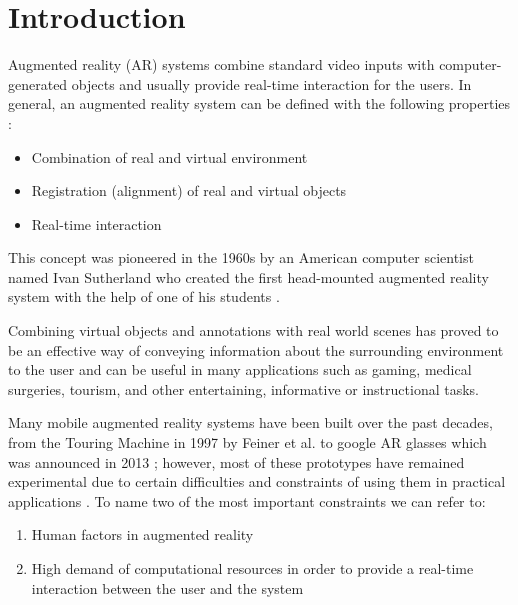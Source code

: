 \chapter{Introduction}
\label{chap:Introduction}

Augmented reality (AR) systems combine standard video inputs with computer-generated objects and
usually provide real-time interaction for the users. 
In general, an augmented reality system can be defined with the following properties \cite{azuma01} :
\begin{itemize}
\item Combination of real and virtual environment
\item Registration (alignment) of real and virtual objects
\item Real-time interaction
\end{itemize}
This concept was pioneered in the 1960s by an American computer scientist named Ivan Sutherland
who created the first head-mounted augmented reality
system with the help of one of his students \cite{azuma01}.

Combining virtual objects and annotations with real
world scenes has proved to be an effective way of conveying information about the surrounding environment to
the user and can be useful in many applications such as gaming, medical surgeries, tourism, and other entertaining, informative or instructional tasks.

Many mobile augmented reality systems have been built over the past decades, from the Touring Machine in 1997 by Feiner et al. \cite{fei97} 
to google AR glasses which was announced in 2013 \cite{google}; however, most of these prototypes have remained experimental
due to certain difficulties and constraints of using them in practical applications \cite{dras96,liv05}. To name two of the most important constraints
we can refer to:
\begin{enumerate}
\item Human factors in augmented reality 
\item High demand of computational resources in order to provide a real-time interaction between the user and the system
\end{enumerate}

